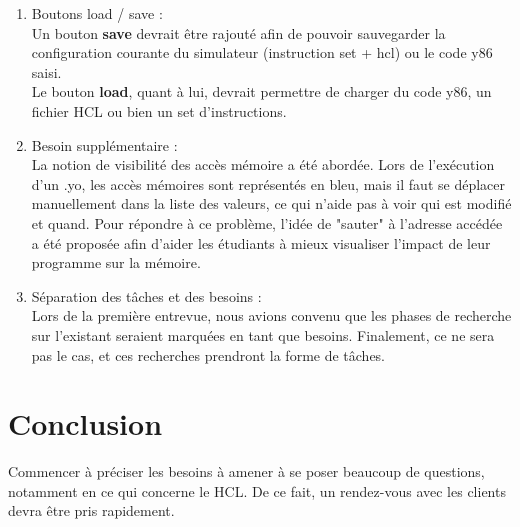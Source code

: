 \documentclass[french]{article}
\begin{document}
\begin{enumerate}
    \\
    \item Boutons load / save :\\
    Un bouton \textbf{save} devrait être rajouté afin de pouvoir sauvegarder la configuration courante du simulateur (instruction set + hcl) ou le code y86 saisi.\\
    Le bouton \textbf{load}, quant à lui, devrait permettre de charger du code y86, un fichier HCL ou bien un set d'instructions.
    \\
    \item Besoin supplémentaire :\\
    La notion de visibilité des accès mémoire a été abordée. Lors de l'exécution d'un .yo, les accès mémoires sont représentés en bleu, mais il faut se déplacer manuellement dans la liste des valeurs, ce qui n'aide pas à voir qui est modifié et quand. Pour répondre à ce problème, l'idée de "sauter" à l'adresse accédée a été proposée afin d'aider les étudiants à mieux visualiser l'impact de leur programme sur la mémoire.
    \\
    \item Séparation des tâches et des besoins :\\
    Lors de la première entrevue, nous avions convenu que les phases de recherche sur l'existant seraient marquées en tant que besoins. Finalement, ce ne sera pas le cas, et ces recherches prendront la forme de tâches.
\end{enumerate}

\section{Conclusion}

Commencer à préciser les besoins à amener à se poser beaucoup de questions, notamment en ce qui concerne le HCL. De ce fait, un rendez-vous avec les clients devra être pris rapidement.
\end{document}
